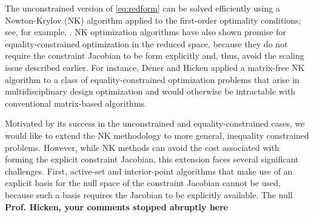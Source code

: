 \documentclass{article}
\theoremstyle{definition}
\begin{document}


The unconstrained version of \eqref{eq:redform} can be solved efficiently using a Newton-Krylov (NK) algorithm applied to the first-order optimality conditions; see, for example, \cite{akcelik:2006, Heinkenschloss:1999:IOA, hinze2010optimization,borzi:2011}. NK optimization algorithms have also shown promise for equality-constrained optimization in the reduced space, because they do not require the constraint Jacobian to be form explicitly and, thus, avoid the scaling issue described earlier.  For instance, Dener and Hicken \cite{dener:idf2017} applied a matrix-free NK algorithm to a class of equality-constrained optimization problems that arise in multidisciplinary design optimization and would otherwise be intractable with conventional matrix-based algorithms.

Motivated by its success in the unconstrained and equality-constrained cases, we would like to extend the NK methodology to  more general, inequality constrained problems. However, while NK methods can avoid the cost associated with forming the explicit constraint Jacobian, this extension faces several significant challenges. First, active-set and interior-point algorithms that make use of an explicit basis for the null space of the constraint Jacobian cannot be used, because such a basis requires the Jacobian to be explicitly available.  The null \textbf{Prof. Hicken, your comments stopped abruptly here}

\end{document}
